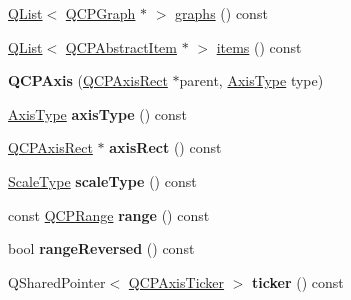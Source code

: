 \begin{DoxyCompactItemize}
\item 
\hyperlink{class_q_list}{Q\+List}$<$ \hyperlink{class_q_c_p_graph}{Q\+C\+P\+Graph} $\ast$ $>$ \hyperlink{class_q_c_p_axis_ad3919e7d7400f55446ea82018fe5e3a8}{graphs} () const 
\item 
\hyperlink{class_q_list}{Q\+List}$<$ \hyperlink{class_q_c_p_abstract_item}{Q\+C\+P\+Abstract\+Item} $\ast$ $>$ \hyperlink{class_q_c_p_axis_ae437656a5fd1a03721a8f2d7aab460fe}{items} () const 
\item 
{\bfseries Q\+C\+P\+Axis} (\hyperlink{class_q_c_p_axis_rect}{Q\+C\+P\+Axis\+Rect} $\ast$parent, \hyperlink{class_q_c_p_axis_ae2bcc1728b382f10f064612b368bc18a}{Axis\+Type} type)\hypertarget{class_q_c_p_axis_ac62c042968bae0e6d474fcfc57c9b71f}{}\label{class_q_c_p_axis_ac62c042968bae0e6d474fcfc57c9b71f}

\item 
\hyperlink{class_q_c_p_axis_ae2bcc1728b382f10f064612b368bc18a}{Axis\+Type} {\bfseries axis\+Type} () const \hypertarget{class_q_c_p_axis_a593c37bf6aa4990326dc09e24f45db7f}{}\label{class_q_c_p_axis_a593c37bf6aa4990326dc09e24f45db7f}

\item 
\hyperlink{class_q_c_p_axis_rect}{Q\+C\+P\+Axis\+Rect} $\ast$ {\bfseries axis\+Rect} () const \hypertarget{class_q_c_p_axis_aada3102af43b029e3879bcbf2bddfabb}{}\label{class_q_c_p_axis_aada3102af43b029e3879bcbf2bddfabb}

\item 
\hyperlink{class_q_c_p_axis_a36d8e8658dbaa179bf2aeb973db2d6f0}{Scale\+Type} {\bfseries scale\+Type} () const \hypertarget{class_q_c_p_axis_a8563e13407bc0616da7f7c84e02de170}{}\label{class_q_c_p_axis_a8563e13407bc0616da7f7c84e02de170}

\item 
const \hyperlink{class_q_c_p_range}{Q\+C\+P\+Range} {\bfseries range} () const \hypertarget{class_q_c_p_axis_ab1ea79a4f5ea4cf42620f8f51c477ac4}{}\label{class_q_c_p_axis_ab1ea79a4f5ea4cf42620f8f51c477ac4}

\item 
bool {\bfseries range\+Reversed} () const \hypertarget{class_q_c_p_axis_ade26dc7994ccd8a11f64fd83377ee021}{}\label{class_q_c_p_axis_ade26dc7994ccd8a11f64fd83377ee021}

\item 
Q\+Shared\+Pointer$<$ \hyperlink{class_q_c_p_axis_ticker}{Q\+C\+P\+Axis\+Ticker} $>$ {\bfseries ticker} () const \hypertarget{class_q_c_p_axis_a8d51c6948f4761b27eba54ca8af887f4}{}\label{class_q_c_p_axis_a8d51c6948f4761b27eba54ca8af887f4}


\end{DoxyCompactItemize}
